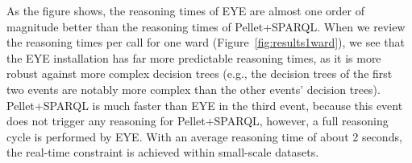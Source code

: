 As the figure shows, the reasoning times of EYE are almost one order of magnitude better than the reasoning times of Pellet+SPARQL. 
When we review the reasoning times per call for one ward (Figure~\ref{fig:results1ward}), we see that the EYE installation has far 
more predictable reasoning times, as it is more robust against more complex decision trees
(e.g., the decision trees of the first two events are notably more complex than the other events' decision trees).
Pellet+SPARQL is much faster than EYE in the third event, because this event does not trigger any reasoning for Pellet+SPARQL, however, 
a full reasoning cycle is performed by EYE. 
With an average reasoning time of about 2 seconds, the real-time constraint is achieved within small-scale datasets.
















